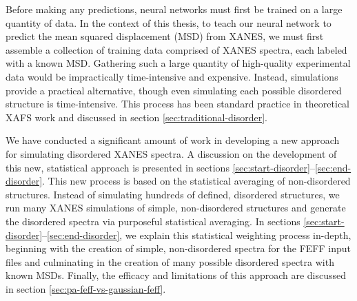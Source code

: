 
Before making any predictions, neural networks must first be trained on a large quantity of data. In the context of this thesis, to teach our neural network to predict the mean squared displacement (MSD) from XANES, we must first assemble a collection of training data comprised of XANES spectra, each labeled with a known MSD. Gathering such a large quantity of high-quality experimental data would be impractically time-intensive and expensive. Instead, simulations provide a practical alternative, though even simulating each possible disordered structure is time-intensive. This process has been standard practice in theoretical XAFS work and discussed in section \ref{sec:traditional-disorder}. 

We have conducted a significant amount of work in developing a new approach for simulating disordered XANES spectra. A discussion on the development of this new, statistical approach is presented in sections \ref{sec:start-disorder}--\ref{sec:end-disorder}. This new process is based on the statistical averaging of non-disordered structures. Instead of simulating hundreds of defined, disordered structures, we run many XANES simulations of simple, non-disordered structures and generate the disordered spectra via purposeful statistical averaging. In sections \ref{sec:start-disorder}--\ref{sec:end-disorder}, we explain this statistical weighting process in-depth, beginning with the creation of simple, non-disordered spectra for the FEFF input files and culminating in the creation of many possible disordered spectra with known MSDs. Finally, the efficacy and limitations of this approach are discussed in section \ref{sec:pa-feff-vs-gaussian-feff}.

